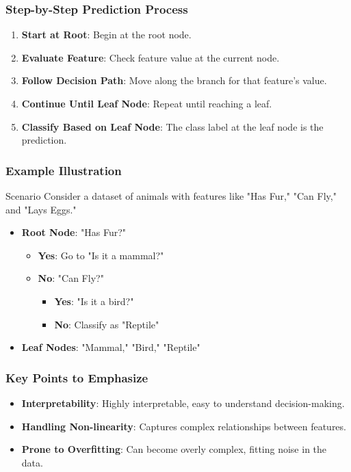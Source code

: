 \documentclass[aspectratio=169]{beamer}
\begin{document}
\begin{frame}[fragile]
    \frametitle{Step-by-Step Prediction Process}
    \begin{enumerate}
        \item \textbf{Start at Root}: Begin at the root node.
        \item \textbf{Evaluate Feature}: Check feature value at the current node.
        \item \textbf{Follow Decision Path}: Move along the branch for that feature's value.
        \item \textbf{Continue Until Leaf Node}: Repeat until reaching a leaf.
        \item \textbf{Classify Based on Leaf Node}: The class label at the leaf node is the prediction.
    \end{enumerate}
\end{frame}

\begin{frame}[fragile]
    \frametitle{Example Illustration}
    \begin{block}{Scenario}
        Consider a dataset of animals with features like "Has Fur," "Can Fly," and "Lays Eggs."
    \end{block}
    \begin{itemize}
        \item \textbf{Root Node}: "Has Fur?"
            \begin{itemize}
                \item \textbf{Yes}: Go to "Is it a mammal?"
                \item \textbf{No}: "Can Fly?"
                    \begin{itemize}
                        \item \textbf{Yes}: "Is it a bird?"
                        \item \textbf{No}: Classify as "Reptile"
                    \end{itemize}
            \end{itemize}
        \item \textbf{Leaf Nodes}: "Mammal," "Bird," "Reptile"
    \end{itemize}
\end{frame}

\begin{frame}[fragile]
    \frametitle{Key Points to Emphasize}
    \begin{itemize}
        \item \textbf{Interpretability}: Highly interpretable, easy to understand decision-making.
        \item \textbf{Handling Non-linearity}: Captures complex relationships between features.
        \item \textbf{Prone to Overfitting}: Can become overly complex, fitting noise in the data.
    \end{itemize}
\end{frame}
\end{document}
